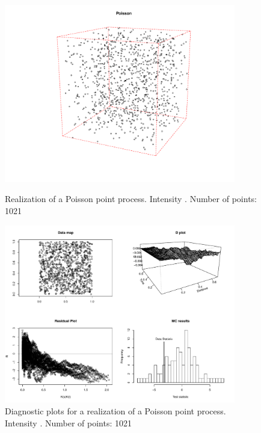 \documentclass{article}
\begin{document}
\begin{figure}[p]
  \centering
    \includegraphics[width=0.9\textwidth]{PP_Poisson_1000_1021.pdf}
  \caption{Realization of a Poisson point process. Intensity . Number of points: 1021}
  \label{fig:poissonPP}


	\vspace*{\floatsep}

    \includegraphics[width=0.9\textwidth]{diag_Poisson_1000_1021.pdf}
  \caption{Diagnostic plots for a realization of a Poisson point process. Intensity . Number of points: 1021}
  \label{fig:poissonDiag}
\end{figure}
\end{document}
